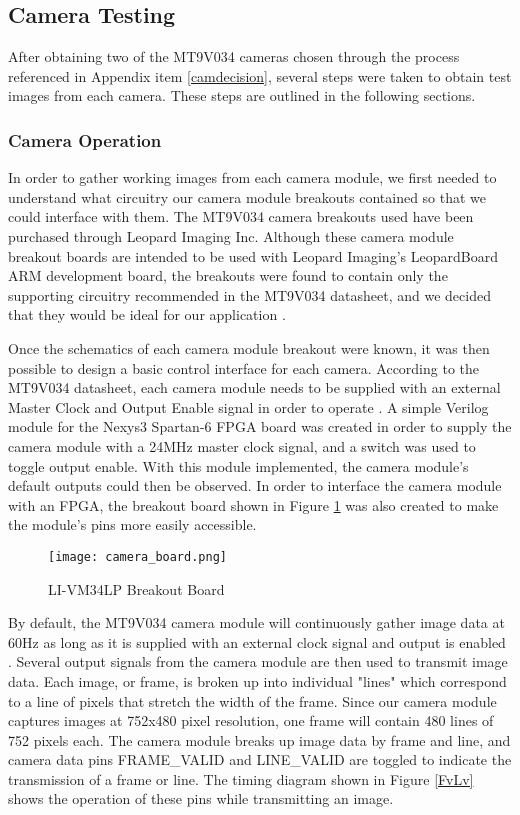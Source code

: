 \subsection{Camera Testing}
After obtaining two of the MT9V034 cameras chosen through the process referenced in Appendix item \ref{camdecision}, several steps were taken to obtain test images from each camera. These steps are outlined in the following sections.

\subsubsection{Camera Operation}
In order to gather working images from each camera module, we first needed to understand what circuitry our camera module breakouts contained so that we could interface with them. The MT9V034 camera breakouts used have been purchased through Leopard Imaging Inc. Although these camera module breakout boards are intended to be used with Leopard Imaging's LeopardBoard ARM development board, the breakouts were found to contain only the supporting circuitry recommended in the MT9V034 datasheet, and we decided that they would be ideal for our application \cite{livm34lp,mt9v034}. 
\par
Once the schematics of each camera module breakout were known, it was then possible to design a basic control interface for each camera. According to the MT9V034 datasheet, each camera module needs to be supplied with an external Master Clock and Output Enable signal in order to operate \cite{mt9v034}. A simple Verilog module for the Nexys3 Spartan-6 FPGA board was created in order to supply the camera module with a 24MHz master clock signal, and a switch was used to toggle output enable. With this module implemented, the camera module's default outputs could then be observed. In order to interface the camera module with an FPGA, the breakout board shown in Figure \ref{camBreakoutBoard} was also created to make the module's pins more easily accessible. 

\begin{figure}[H]
	\centerline{\texttt{[image: camera\_board.png]}}
	\caption{LI-VM34LP Breakout Board}
	\label{camBreakoutBoard}
\end{figure}

\par
By default, the MT9V034 camera module will continuously gather image data at 60Hz  as long as it is supplied with an external clock signal and output is enabled \cite{mt9v034}. Several output signals from the camera module are then used to transmit image data. Each image, or frame, is broken up into individual "lines" which correspond to a line of pixels that stretch the width of the frame. Since our camera module captures images at 752x480 pixel resolution, one frame will contain 480 lines of 752 pixels each. The camera module breaks up image data by frame and line, and camera data pins FRAME\_VALID and LINE\_VALID are toggled to indicate the transmission of a frame or line. The timing diagram shown in Figure \ref{FvLv} shows the operation of these pins while transmitting an image.

